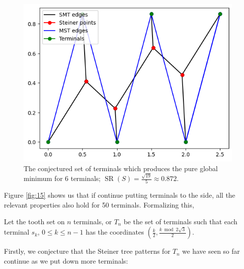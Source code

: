 \documentclass{mpaper}
\begin{document}
\begin{figure}[h!]
  \begin{center}
  \includegraphics[scale=0.5]{plot13.png}
  \end{center}
  \caption{\label{fig:14} The conjectured set of terminals which produces the pure global minimum for 6 terminals; $\operatorname{SR}(S) = \frac{\sqrt{19}}{5}\approx 0.872$.}
\end{figure}


Figure \ref{fig:15} shows us that if continue putting terminals to the side, all the relevant properties also hold for 50 terminals. Formalizing this,

\begin{definition}
  Let the tooth set on $n$ terminals, or $T_n$ be the set of terminals such that each terminal $s_k$, $0\leq k \leq n-1$ has the coordinates $\left(\frac{k}{2}, \frac{k \bmod 2\sqrt{3}}{2}\right)$.
\end{definition}

Firstly, we conjecture that the Steiner tree patterns for $T_n$ we have seen so far continue as we put down more terminals:
\end{document}
